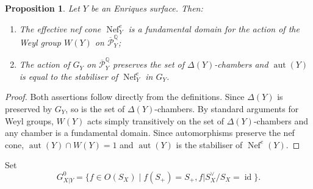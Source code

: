 \documentclass{amsart}
\theoremstyle{definition}
\theoremstyle{plain}
\newtheorem{proposition}[definition]{Proposition}
\DeclareMathOperator{\Nef}{Nef}
\DeclareMathOperator{\id}{id}
\DeclareMathOperator{\aut}{aut}
\renewcommand{\P}{\mathcal{P}}
\newcommand{\Pbar}{\overline{\P}^\mathbb{Q}}
\begin{document}
\begin{proposition}\label{prop:fundamental_domain}
Let $Y$ be an Enriques surface. Then:
\begin{enumerate}
    \item The effective nef cone $\Nef^{e}_Y$ is a fundamental domain for the action of the Weyl group $W(Y)$ on $\Pbar_Y$;
    \item The action of $G_Y$ on $\Pbar_Y$ preserves the set of $\Delta(Y)$-chambers and $\aut(Y)$ is equal to the stabiliser of $\Nef^{e}_Y$ in $G_Y$.
\end{enumerate}
\end{proposition}
\begin{proof}

Both assertions follow directly from the definitions.
Since $\Delta(Y)$ is preserved by $G_Y$, so is the set of $\Delta(Y)$-chambers. By standard arguments for Weyl groups, $W(Y)$ acts simply transitively on the set of $\Delta(Y)$-chambers and any chamber is a fundamental domain.
Since automorphisms preserve the nef cone, $\aut(Y) \cap W(Y) = 1$ and $\aut(Y)$ is the stabiliser of $\Nef^{e}(Y)$.
\end{proof}




Set
\[G_{X|Y}^0 = \{f \in O(S_X) \mid f(S_+) = S_+, f|S_X^\vee/S_X =\id\}.\]
\end{document}
